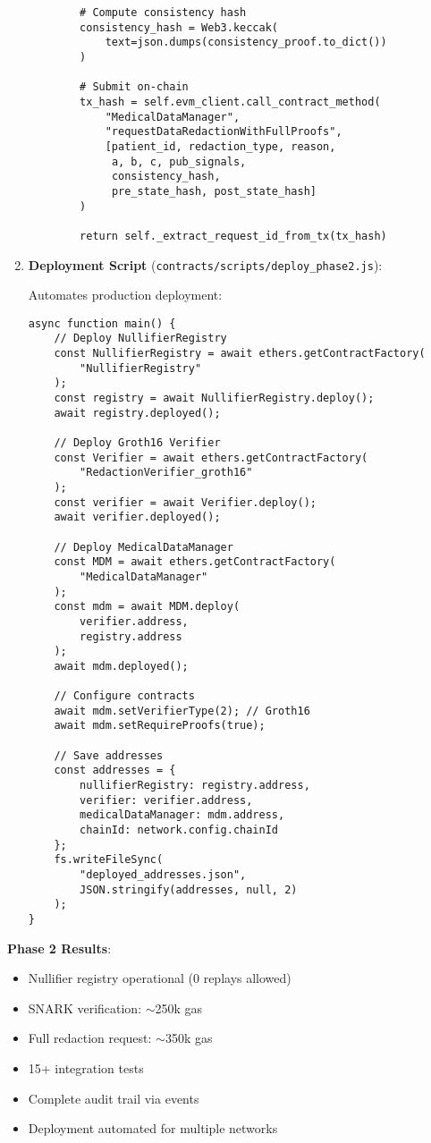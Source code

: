 \begin{enumerate}
\begin{verbatim}
        # Compute consistency hash
        consistency_hash = Web3.keccak(
            text=json.dumps(consistency_proof.to_dict())
        )
        
        # Submit on-chain
        tx_hash = self.evm_client.call_contract_method(
            "MedicalDataManager",
            "requestDataRedactionWithFullProofs",
            [patient_id, redaction_type, reason, 
             a, b, c, pub_signals,
             consistency_hash,
             pre_state_hash, post_state_hash]
        )
        
        return self._extract_request_id_from_tx(tx_hash)
\end{verbatim}
    
    \item \textbf{Deployment Script} (\texttt{contracts/scripts/deploy\_phase2.js}):
    
    Automates production deployment:
    
    \begin{verbatim}
async function main() {
    // Deploy NullifierRegistry
    const NullifierRegistry = await ethers.getContractFactory(
        "NullifierRegistry"
    );
    const registry = await NullifierRegistry.deploy();
    await registry.deployed();
    
    // Deploy Groth16 Verifier
    const Verifier = await ethers.getContractFactory(
        "RedactionVerifier_groth16"
    );
    const verifier = await Verifier.deploy();
    await verifier.deployed();
    
    // Deploy MedicalDataManager
    const MDM = await ethers.getContractFactory(
        "MedicalDataManager"
    );
    const mdm = await MDM.deploy(
        verifier.address,
        registry.address
    );
    await mdm.deployed();
    
    // Configure contracts
    await mdm.setVerifierType(2); // Groth16
    await mdm.setRequireProofs(true);
    
    // Save addresses
    const addresses = {
        nullifierRegistry: registry.address,
        verifier: verifier.address,
        medicalDataManager: mdm.address,
        chainId: network.config.chainId
    };
    fs.writeFileSync(
        "deployed_addresses.json",
        JSON.stringify(addresses, null, 2)
    );
}
\end{verbatim}
\end{enumerate}

\textbf{Phase 2 Results}:
\begin{itemize}
    \item Nullifier registry operational (0 replays allowed)
    \item SNARK verification: $\sim$250k gas
    \item Full redaction request: $\sim$350k gas
    \item 15+ integration tests
    \item Complete audit trail via events
    \item Deployment automated for multiple networks
\end{itemize}

